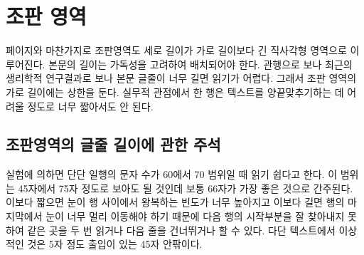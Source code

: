 \section{조판 영역}
\label{sec:typeblock2}

페이지와 마찬가지로 조판영역도 세로 길이가 가로 길이보다 긴 직사각형
영역으로 이루어진다.
본문의 길이는 가독성을 고려하여 배치되어야 한다. 관행으로 보나
최근의 생리학적 연구결과로 보나 본문 글줄이 너무 길면 읽기가 어렵다.
그래서 조판 영역의 가로 길이에는 상한을 둔다. 실무적 관점에서
한 행은 텍스트를 양끝맞추기하는 데 어려울 정도로 너무 짧아서도 안 된다.

\subsection{조판영역의 글줄 길이에 관한 주석}

실험에 의하면 단단 일행의 문자 수가 60에서 70 범위일 때 읽기 쉽다고 한다. 이 범위는 45자에서 75자 정도로 보아도 될 것인데 보통 66자가
가장 좋은 것으로 간주된다. 이보다 짧으면 눈이 행 사이에서 왕복하는 빈도가 너무
높아지고 이보다 길면 행의 마지막에서 눈이 너무 멀리 이동해야 하기 때문에
다음 행의 시작부분을 잘 찾아내지 못하여 같은 곳을 두 번 읽거나 다음 줄을 건너뛰거나
할 수 있다. 다단 텍스트에서 이상적인 것은 5자 정도 출입이 있는 45자 안팎이다.

